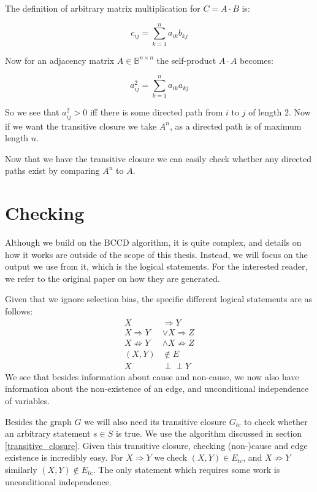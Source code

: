 \documentclass[11pt,a4paper]{report}
\theoremstyle{definition}
\def\ci{\perp\!\!\!\perp}
\begin{document}
The definition of arbitrary matrix multiplication for $C = A \cdot B$ is:

\begin{equation*}
  c_{ij} = \sum ^n_{k=1} a_{ik}b_{kj}
\end{equation*}

Now for an adjacency matrix $A \in \mathbb{B}^{n \times n}$ the
self-product $A \cdot A$ becomes:

\begin{equation*}
  a^2_{ij} = \sum ^n_{k=1} a_{ik}a_{kj}
\end{equation*}

So we see that $a^2_{ij} > 0$ iff there is some directed path from $i$ to
$j$ of length 2. Now if we want the transitive closure we take $A^n$, as a
directed path is of maximum length $n$.

Now that we have the transitive closure we can easily check whether any
directed paths exist by comparing $A^n$ to $A$.

\section{Checking}\label{checking}
Although we build on the BCCD algorithm, it is quite complex, and details
on how it works are outside of the scope of this thesis. Instead, we will
focus on the output we use from it, which is the logical statements. For
the interested reader, we refer to the original paper on how they are
generated\cite{claassenBayesianApproachConstraint2012}.

Given that we ignore selection bias, the specific different logical
statements are as follows:
\begin{align*}
  X &\Rightarrow Y \\
  X \Rightarrow Y &\lor X \Rightarrow Z \\
  X \not \Rightarrow Y &\land X \not \Rightarrow Z \\
  (X, Y) &\notin E \\
  X &\ci Y
\end{align*}
We see that besides information about cause and non-cause, we now also
have information about the non-existence of an edge, and unconditional
independence of variables.

Besides the graph $G$ we will also need its transitive closure $G_{tc}$ to
check whether an arbitrary statement $s \in S$ is true. We use the
algorithm discussed in section \ref{transitive_closure}. Given this
transitive closure, checking (non-)cause and edge existence is incredibly
easy. For $X \Rightarrow Y$ we check $(X, Y) \in E_{tc}$, and $X \not
\Rightarrow Y$ similarly $(X, Y) \notin E_{tc}$. The only statement which
requires some work is unconditional independence.
\end{document}

